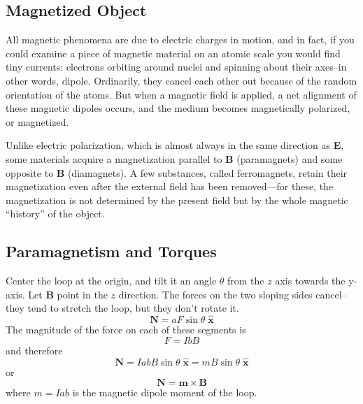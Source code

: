\documentclass[../../../main.tex]{subfiles}
\begin{document}
\subsection{Magnetized Object}
All magnetic phenomena are due to electric charges in motion, and in fact, if you could examine a piece of magnetic material on an atomic scale you would ﬁnd tiny currents: electrons orbiting around nuclei and spinning about their axes--in other words, dipole. Ordinarily, they cancel each other out because of the random orientation of the atoms. But when a magnetic ﬁeld is applied, a net alignment of these magnetic dipoles occurs, and the medium becomes magnetically polarized, or magnetized. 

Unlike electric polarization, which is almost always in the same direction as \textbf{E}, some materials acquire a magnetization parallel to \textbf{B} (paramagnets) and some opposite to \textbf{B} (diamagnets). A few substances, called ferromagnets, retain their magnetization even after the external ﬁeld has been removed—for these, the magnetization is not determined by the present ﬁeld but by the whole magnetic “history” of the object.

\subsection{Paramagnetism and Torques}
Center the loop at the origin, and tilt it an angle $\theta$ from the $z$ axis towards the y-axis. Let \textbf{B} point in the $z$ direction. The forces on the two sloping sides cancel--they tend to stretch the loop, but they don’t rotate it. 
\begin{equation*}
    \mathbf{N} = aF \sin \theta\; \mathbf{\hat{x}}
\end{equation*}
The magnitude of the force on each of these segments is
\begin{equation*}
    F = I bB
\end{equation*}
and therefore
\begin{equation*}
    \mathbf{N} = I abB \sin \theta\; \mathbf{\hat{x}}=mB\sin\theta\;\mathbf{\hat{x}}
\end{equation*}
or
\begin{equation*}
    \mathbf{N}=\mathbf{m}\times\mathbf{B}
\end{equation*}
where $m = I ab$ is the magnetic dipole moment of the loop. 
\begin{figure*}[b]
    \centering
\end{figure*}
\end{document}
